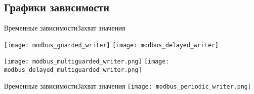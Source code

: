 \subsection{Графики зависимости}
\begin{frame}{Временные зависимости}{Захват значения}
    \vspace{-20mm}
    \begin{minipage}[c]{0.47\linewidth}
        \texttt{[image: modbus\_guarded\_writer]}%
        \texttt{[image: modbus\_delayed\_writer]}
    \end{minipage}

    \begin{minipage}[c]{0.47\linewidth}
        \texttt{[image: modbus\_multiguarded\_writer.png]}%
        \texttt{[image: modbus\_delayed\_multiguarded\_writer.png]}
    \end{minipage}
\end{frame}
\begin{frame}{Временные зависимости}{Захват значения}
    \texttt{[image: modbus\_periodic\_writer.png]}
\end{frame}


